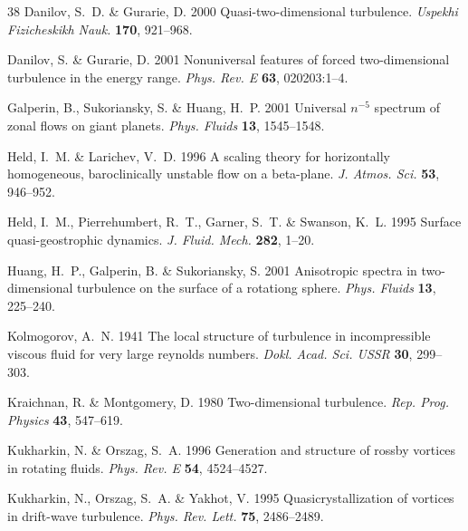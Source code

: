 \documentclass{jfm}
\begin{document}
\begin{thebibliography}{38}
 {\sc Danilov, S.~D. \&
    Gurarie, D.} 2000 Quasi-two-dimensional turbulence. {\em Uspekhi
    Fizicheskikh Nauk.\/} {\bf 170}, 921--968.

{\sc Danilov, S. \& Gurarie, D.} 2001 Nonuniversal features of forced
 two-dimensional turbulence in the energy range. {\em Phys. Rev. E\/} {\bf
  63}, 020203:1--4.

 {\sc Galperin, B., Sukoriansky, S. \& Huang,
    H.~P.} 2001 Universal $n^{-5}$ spectrum of zonal flows on giant
  planets. {\em Phys. Fluids\/} {\bf 13}, 1545--1548.
  
 {\sc Held, I.~M. \& Larichev,
    V.~D.} 1996 A scaling theory for horizontally homogeneous,
  baroclinically unstable flow on a beta-plane. {\em J. Atmos.
    Sci.\/} {\bf 53}, 946--952.
  
 {\sc Held, I.~M., Pierrehumbert, R.~T., Garner,
    S.~T. \& Swanson, K.~L.} 1995 Surface quasi-geostrophic dynamics.
  {\em J. Fluid. Mech.\/} {\bf 282}, 1--20.
  
 {\sc Huang, H.~P., Galperin, B. \&
    Sukoriansky, S.} 2001 Anisotropic spectra in two-dimensional
  turbulence on the surface of a rotationg sphere. {\em Phys.
    Fluids\/} {\bf 13}, 225--240.

{\sc Kolmogorov, A.~N.} 1941 The local structure of turbulence in
  incompressible viscous fluid for very large reynolds numbers. {\em Dokl.
  Acad. Sci. USSR\/} {\bf 30}, 299--303.

{\sc Kraichnan, R. \& Montgomery, D.} 1980 Two-dimensional turbulence. {\em
  Rep. Prog. Physics\/} {\bf 43}, 547--619.

{\sc Kukharkin, N. \& Orszag, S.~A.} 1996 Generation and structure of rossby
  vortices in rotating fluids. {\em Phys. Rev. E\/} {\bf 54}, 4524--4527.

{\sc Kukharkin, N., Orszag, S.~A. \& Yakhot, V.} 1995 Quasicrystallization of
  vortices in drift-wave turbulence. {\em Phys. Rev. Lett.\/} {\bf 75},
  2486--2489.


\end{thebibliography}
\end{document}
